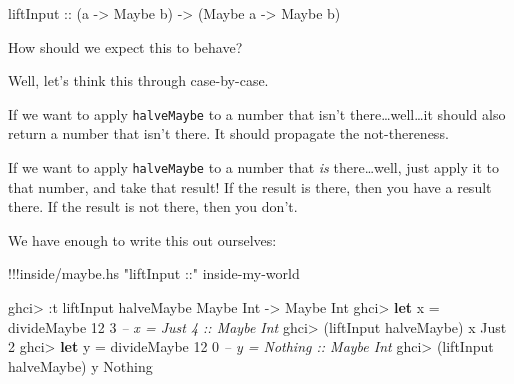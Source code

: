\documentclass[]{article}
\newenvironment{Shaded}{}{}
\newcommand{\KeywordTok}[1]{\textcolor[rgb]{0.00,0.44,0.13}{\textbf{{#1}}}}
\newcommand{\DataTypeTok}[1]{\textcolor[rgb]{0.56,0.13,0.00}{{#1}}}
\newcommand{\DecValTok}[1]{\textcolor[rgb]{0.25,0.63,0.44}{{#1}}}
\newcommand{\StringTok}[1]{\textcolor[rgb]{0.25,0.44,0.63}{{#1}}}
\newcommand{\CommentTok}[1]{\textcolor[rgb]{0.38,0.63,0.69}{\textit{{#1}}}}
\newcommand{\OtherTok}[1]{\textcolor[rgb]{0.00,0.44,0.13}{{#1}}}
\newcommand{\FunctionTok}[1]{\textcolor[rgb]{0.02,0.16,0.49}{{#1}}}
\newcommand{\NormalTok}[1]{{#1}}
\begin{document}
\begin{Shaded}
\begin{Highlighting}[]
\OtherTok{liftInput ::} \NormalTok{(a }\OtherTok{->} \DataTypeTok{Maybe} \NormalTok{b) }\OtherTok{->} \NormalTok{(}\DataTypeTok{Maybe} \NormalTok{a }\OtherTok{->} \DataTypeTok{Maybe} \NormalTok{b)}
\end{Highlighting}
\end{Shaded}

How should we expect this to behave?

Well, let's think this through case-by-case.

If we want to apply \texttt{halveMaybe} to a number that isn't
there\ldots{}well\ldots{}it should also return a number that isn't
there. It should propagate the not-thereness.

If we want to apply \texttt{halveMaybe} to a number that \emph{is}
there\ldots{}well, just apply it to that number, and take that result!
If the result is there, then you have a result there. If the result is
not there, then you don't.

We have enough to write this out ourselves:

\begin{Shaded}
\begin{Highlighting}[]
\FunctionTok{!!!}\NormalTok{inside}\FunctionTok{/}\NormalTok{maybe}\FunctionTok{.}\NormalTok{hs }\StringTok{"liftInput ::"} \NormalTok{inside}\FunctionTok{-}\NormalTok{my}\FunctionTok{-}\NormalTok{world}
\end{Highlighting}
\end{Shaded}

\begin{Shaded}
\begin{Highlighting}[]
\NormalTok{ghci}\FunctionTok{>} \FunctionTok{:}\NormalTok{t liftInput halveMaybe}
\DataTypeTok{Maybe} \DataTypeTok{Int} \OtherTok{->} \DataTypeTok{Maybe} \DataTypeTok{Int}
\NormalTok{ghci}\FunctionTok{>} \KeywordTok{let} \NormalTok{x }\FunctionTok{=} \NormalTok{divideMaybe }\DecValTok{12} \DecValTok{3}     \CommentTok{-- x = Just 4 :: Maybe Int}
\NormalTok{ghci}\FunctionTok{>} \NormalTok{(liftInput halveMaybe) x}
\DataTypeTok{Just} \DecValTok{2}
\NormalTok{ghci}\FunctionTok{>} \KeywordTok{let} \NormalTok{y }\FunctionTok{=} \NormalTok{divideMaybe }\DecValTok{12} \DecValTok{0}     \CommentTok{-- y = Nothing :: Maybe Int}
\NormalTok{ghci}\FunctionTok{>} \NormalTok{(liftInput halveMaybe) y}
\DataTypeTok{Nothing}
\end{Highlighting}
\end{Shaded}
\end{document}
